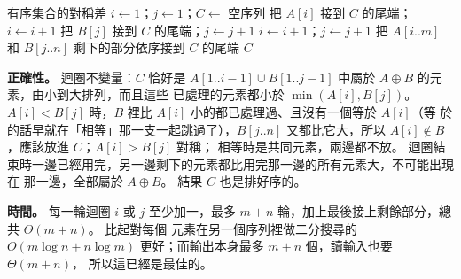 \begin{pastsoln}
\begin{pseudo}{有序集合的對稱差}
    \State $i \gets 1$；$j \gets 1$；$C \gets$ 空序列
            \State 把 $A[i]$ 接到 $C$ 的尾端；$i \gets i + 1$
            \State 把 $B[j]$ 接到 $C$ 的尾端；$j \gets j + 1$
        \Else
            \State $i \gets i + 1$；$j \gets j + 1$ 
        \EndIf
    \EndWhile
    \State 把 $A[i..m]$ 和 $B[j..n]$ 剩下的部分依序接到 $C$ 的尾端
    \State \Return $C$
\EndFunction
\end{pseudo}

\textbf{正確性。} 迴圈不變量：$C$ 恰好是 $A[1..i-1] \cup B[1..j-1]$ 中屬於 $A \oplus B$ 的元素，由小到大排列，而且這些
已處理的元素都小於 $\min(A[i], B[j])$。 $A[i] < B[j]$ 時，$B$ 裡比 $A[i]$ 小的都已處理過、且沒有一個等於 $A[i]$（等
於的話早就在「相等」那一支一起跳過了），$B[j..n]$ 又都比它大，所以 $A[i] \notin B$，應該放進 $C$；$A[i] > B[j]$ 對稱；
相等時是共同元素，兩邊都不放。 迴圈結束時一邊已經用完，另一邊剩下的元素都比用完那一邊的所有元素大，不可能出現在
那一邊，全部屬於 $A \oplus B$。 結果 $C$ 也是排好序的。

\textbf{時間。} 每一輪迴圈 $i$ 或 $j$ 至少加一，最多 $m + n$ 輪，加上最後接上剩餘部分，總共 $\Theta(m + n)$。 比起對每個
元素在另一個序列裡做二分搜尋的 $O(m \log n + n \log m)$ 更好；而輸出本身最多 $m + n$ 個，讀輸入也要 $\Theta(m + n)$，
所以這已經是最佳的。
\end{pastsoln}
